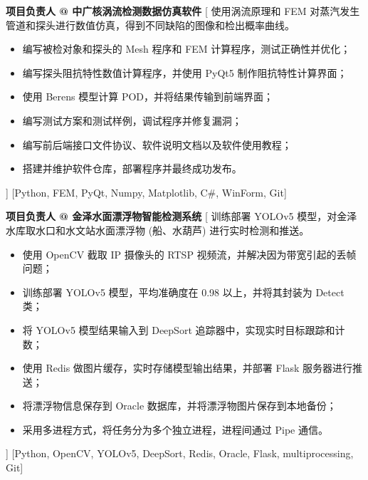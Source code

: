 \begin{experiences}
    {\textbf{项目负责人 @ 中广核涡流检测数据仿真软件}}%
    [
    使用涡流原理和 FEM 对蒸汽发生管道和探头进行数值仿真，得到不同缺陷的图像和检出概率曲线。
        \begin{itemize}
            \item {编写被检对象和探头的 Mesh 程序和 FEM 计算程序，测试正确性并优化；}
            \item {编写探头阻抗特性数值计算程序，并使用 PyQt5 制作阻抗特性计算界面；}
            \item {使用 Berens 模型计算 POD，并将结果传输到前端界面；}
            \item {编写测试方案和测试样例，调试程序并修复漏洞；}
            \item {编写前后端接口文件协议、软件说明文档以及软件使用教程；}
            \item {搭建并维护软件仓库，部署程序并最终成功发布。}
        \end{itemize}
    ]
    [Python, FEM, PyQt, Numpy, Matplotlib, C\#, WinForm, Git]
    \separator{0.5ex}

    {\textbf{项目负责人 @ 金泽水面漂浮物智能检测系统}}%
    [
    训练部署 YOLOv5 模型，对金泽水库取水口和水文站水面漂浮物 (船、水葫芦) 进行实时检测和推送。
        \begin{itemize}
            \item {使用 OpenCV 截取 IP 摄像头的 RTSP 视频流，并解决因为带宽引起的丢帧问题；}
            \item {训练部署 YOLOv5 模型，平均准确度在 0.98 以上，并将其封装为 Detect 类；}
            \item {将 YOLOv5 模型结果输入到 DeepSort 追踪器中，实现实时目标跟踪和计数；}
            \item {使用 Redis 做图片缓存，实时存储模型输出结果，并部署 Flask 服务器进行推送；}
            \item {将漂浮物信息保存到 Oracle 数据库，并将漂浮物图片保存到本地备份；}
            \item {采用多进程方式，将任务分为多个独立进程，进程间通过 Pipe 通信。}
        \end{itemize}]
    [Python, OpenCV, YOLOv5, DeepSort, Redis, Oracle, Flask, multiprocessing, Git]
\end{experiences}